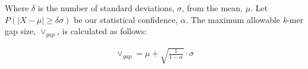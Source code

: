 \documentclass{article}
\begin{document}
Where \(\delta\) is the number of standard deviations, \(\sigma\), from the mean, \(\mu\). Let \mbox{\(P(|X - \mu| \geq \delta\sigma)\)} be our statistical confidence, \(\alpha\). The maximum allowable \textit{k}-mer gap size, \(\vee_{gap}\), is calculated as follows:

\begin{equation}
\label{eq:maxgap}
\begin{split}
  \vee_{gap} = \mu + \sqrt{\frac{1}{1 - \alpha}} \cdot \sigma
\end{split}
\end{equation}

{}

  
\end{document}
